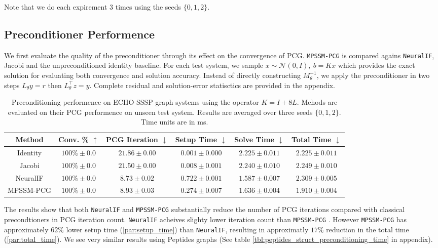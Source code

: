 Note that we do each expirement 3 times using the seeds $\{0,1,2\}$.

\subsection{Preconditioner Performence}

We first evaluate the quality of the preconditioner through its effect on the
convergence of PCG. \texttt{MPSSM-PCG} is compared agains \texttt{NeuralIF},
Jacobi and the unpreconditioned identity baseline. For each test system, we
sample $x\sim \mathcal{N}(0,I),\ b = Kx$ which provides the exact solution for
evaluating both convergence and solution accuracy. Instead of directly
constructing $M^{-1}_\theta$, we apply the preconditioner in two steps
$L_\theta y = r$ then  $L_\theta^\top z = y$. Complete residual and
solution-error statisctics are provided in the appendix.

\begin{table}[H]
    \caption{
        Preconditioning performence on ECHO-SSSP graph systems using the
        operator $K = I + 8L$. Mehods are evaluated on their PCG performence on
        unseen test system. Results are averaged over three seeds $\{0,1,2\}$.
        Time units are in ms.
    }
    \centering
    \small
    \label{tbl:echo_sssp_preconditioning_time}
    \begin{tabular}{c c c c c c}
        Method    & Conv. \%   $\uparrow$ & PCG Iteration $\downarrow$ & Setup Time $\downarrow$  & Solve Time $\downarrow$ & Total Time $\downarrow$ \\
        \hline
        Identity  & $100\% \pm 0.0$       & $21.86\pm 0.00$            & $\mathbf{0.001}\pm0.000$ & $2.225\pm0.011$          & $2.225\pm0.011$          \\
        Jacobi    & $100\% \pm 0.0$       & $21.50\pm 0.00$            & $0.008\pm0.001$          & $2.240\pm0.010$          & $2.249\pm0.010$          \\
        NeuralIF  & $100\% \pm 0.0$       & $\mathbf{8.73} \pm 0.02$   & $0.722\pm0.001$          & $\mathbf{1.587}\pm0.007$ & $2.309\pm0.005$          \\
        MPSSM-PCG & $100\% \pm 0.0$       & $8.93 \pm 0.03$            & $0.274\pm0.007$          & $1.636\pm0.004$          & $\mathbf{1.910}\pm0.004$ \\
    \end{tabular}
\end{table}

The results show that both \texttt{NeuralIF} and \texttt{MPSSM-PCG}
substantially reduce the number of PCG iterations compared with classical
precondtioners in PCG iteration count. \texttt{NeuralIF} acheives slighty lower
iteration count than \texttt{MPSSM-PCG} . However \texttt{MPSSM-PCG} has approximately
$62\%$ lower setup time (\ref{par:setup_time}) than \texttt{NeuralIF}, resulting in
approximatly $17\%$ reduction in the total time (\ref{par:total_time}). We see very similar results
using Peptides graphs \cite{dwivediLongRangeGraph2023} (See table
\ref{tbl:peptides_struct_preconditioning_time} in appendix).

